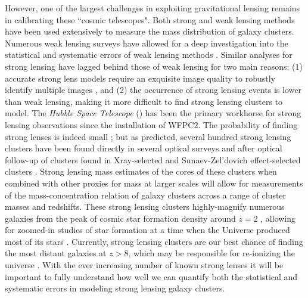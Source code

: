However, one of the largest challenges in exploiting gravitational lensing remains in calibrating these ``cosmic telescopes". Both strong and weak lensing methods have been used extensively to measure the mass distribution of galaxy clusters. Numerous weak lensing surveys have allowed for a deep investigation into the statistical and systematic errors of weak lensing methods \citep{Shirasaki:2014qf,Applegate:2014jk,Massey:2013xy}. Similar analyses for strong lensing have lagged behind those of weak lensing for two main reasons: (1) accurate strong lens models require an exquisite image quality to robustly identify multiple images \citep{Kneib:1996kb}, and (2) the occurrence of strong lensing events is lower than weak lensing, making it more difficult to find strong lensing clusters to model. The {\it Hubble Space Telescope} (\hst) has been the primary workhorse for strong lensing observations since the installation of WFPC2. The probability of finding strong lenses is indeed small \citep{Wambsganss:2004vn,Bartelmann:1998fr}; but as predicted, several hundred strong lensing clusters have been found directly in several optical surveys \citep{Hennawi:2008mz,Gladders:2003zr} and after optical follow-up of clusters found in Xray-selected \citep{Postman:2012lr} and Sunaev-Zel'dovich effect-selected clusters \citep{Bleem:2015gf,Menanteau:2010fu}. Strong lensing mass estimates of the cores of these clusters when combined with other proxies for mass at larger scales will allow for measurements of the mass-concentration relation of galaxy clusters \citep{Merten:2015rz,Oguri:2012bs,Gralla:2011kx} across a range of cluster masses and redshifts. These strong lensing clusters highly-magnify numerous galaxies from the peak of cosmic star formation density around $z=2$ \citep{Bayliss:2011gf}, allowing for zoomed-in studies of star formation at a time when the Universe produced most of its stars \citep{Madau:2014qd}. Currently, strong lensing clusters are our best chance of finding the most distant galaxies at $z>8$, which may be responsible for re-ionizing the universe \citep[][to name a few]{McLeod:2015nr,Atek:2015qv,Zitrin:2014uq,Coe:2015qf}. With the ever increasing number of known strong lenses it will be important to fully understand how well we can quantify both the statistical and systematic errors in modeling strong lensing galaxy clusters.

